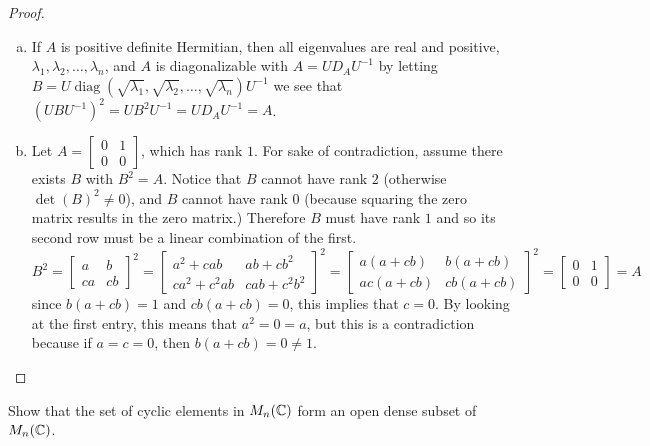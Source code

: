 \documentclass{article}
\begin{document}
\begin{proof} ~
  \begin{enumerate}[(a)]
    \item If $A$ is positive definite Hermitian, then all eigenvalues are real
    and positive, $\lambda_1, \lambda_2, \hdots, \lambda_n$, and $A$ is diagonalizable with $A = UD_AU^{-1}$ by letting $B = U\operatorname{diag}(\sqrt{\lambda_1}, \sqrt{\lambda_2}, \hdots, \sqrt{\lambda_n})U^{-1}$ we see that
    $(UBU^{-1})^2 = UB^2U^{-1} = UD_AU^{-1} = A$.
    \item Let $\displaystyle A = \begin{bmatrix} 0 & 1 \\ 0 & 0\end{bmatrix}$,
    which has rank $1$. For sake of contradiction, assume there exists $B$ with
    $B^2 = A$. Notice that $B$ cannot have rank $2$ (otherwise
    $\det(B)^2 \neq 0$), and $B$ cannot have rank $0$ (because squaring the zero
    matrix results in the zero matrix.)
    Therefore $B$ must have rank $1$ and so its second row must be a linear
    combination of the first. \[
      B^2
        = \begin{bmatrix} a & b \\ ca & cb\end{bmatrix}^2
        = \begin{bmatrix} a^2 + cab & ab + cb^2 \\ ca^2+c^2ab & cab + c^2b^2\end{bmatrix}^2
        = \begin{bmatrix} a(a + cb) & b(a + cb) \\ ac(a + cb) & cb(a + cb)\end{bmatrix}^2
        = \begin{bmatrix} 0 & 1 \\ 0 & 0\end{bmatrix}
        = A
    \] since $b(a + cb) = 1$ and $cb(a + cb) = 0$, this implies that $c = 0$.
    By looking at the first entry, this means that $a^2 = 0 = a$, but this is a
    contradiction because if $a = c = 0$, then $b(a + cb) = 0 \neq 1$.
  \end{enumerate}
\end{proof}

\begin{problem}{4} Show that the set of cyclic elements in $M_n(\mathbb C)$ form an open dense subset of $M_n(\mathbb C)$.
\end{problem}
\end{document}
